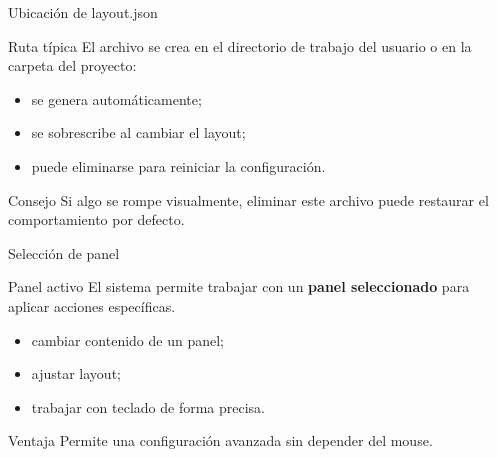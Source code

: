 \documentclass[aspectratio=169,professionalfonts]{beamer}
\newcommand{\bluebf}[1]{\textcolor{PVBlue}{\textbf{#1}}}
\newcommand{\codebox}[1]{%
\fbox{%
\parbox{0.94\linewidth}{%
\ttfamily\small #1
}%
}%
}
\begin{document}
\begin{frame}{Ubicación de layout.json}
\begin{block}{Ruta típica}
El archivo se crea en el directorio de trabajo del usuario o en la carpeta del proyecto:

\vspace{0.3cm}
\codebox{./layout.json}
\end{block}

\begin{itemize}
  \item se genera automáticamente;
  \item se sobrescribe al cambiar el layout;
  \item puede eliminarse para reiniciar la configuración.
\end{itemize}

\begin{alertblock}{Consejo}
Si algo se rompe visualmente, eliminar este archivo puede restaurar el comportamiento por defecto.
\end{alertblock}

\end{frame}

\begin{frame}{Selección de panel}
\begin{block}{Panel activo}
El sistema permite trabajar con un \bluebf{panel seleccionado} para aplicar acciones específicas.
\end{block}

\begin{itemize}
  \item cambiar contenido de un panel;
  \item ajustar layout;
  \item trabajar con teclado de forma precisa.
\end{itemize}

\begin{exampleblock}{Ventaja}
Permite una configuración avanzada sin depender del mouse.
\end{exampleblock}

\end{frame}
\end{document}

